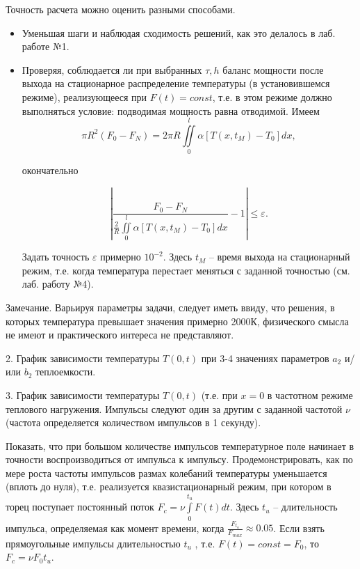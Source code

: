 \documentclass[a4paper,14pt]{article}
\begin{document}
Точность расчета можно оценить разными способами.

\begin{itemize}
	\item Уменьшая шаги и наблюдая сходимость решений, как это делалось в лаб. работе №1. 
	\item Проверяя, соблюдается ли при выбранных $\tau, h$ баланс мощности после выхода на стационарное распределение температуры (в установившемся режиме), реализующееся при
	$F(t) = const$, т.е. в этом режиме  должно выполняться условие: подводимая мощность  равна отводимой. Имеем
	\begin{equation}
		\pi R^2 (F_0 - F_N) = 2 \pi R \iint\limits_0^l \alpha[T(x, t_M) - T_0] dx,
	\end{equation}

	окончательно

	\begin{equation}
		\left| \frac{F_0 - F_N}{ \frac{2}{R} \iint\limits_0^l \alpha[T(x, t_M) - T_0] dx } - 1 \right| \leq \varepsilon.
	\end{equation}

	Задать точность $\varepsilon$ примерно $10^{-2}$. Здесь
	$t_M$ -- время выхода на стационарный режим, т.е. когда температура перестает меняться с заданной точностью (см. лаб. работу №4).
\end{itemize}

Замечание. Варьируя параметры задачи, следует иметь ввиду, что решения, в которых температура превышает значения примерно 2000К, физического смысла не имеют и практического интереса не представляют.

2. График зависимости температуры $T(0, t)$ при 3-4 значениях параметров
$a_2$ и/или $b_2$ теплоемкости.

3. График зависимости температуры $T(0, t)$ (т.е. при $x = 0$ 
в частотном режиме теплового нагружения. Импульсы следуют один за другим с заданной частотой $\nu$
(частота определяется количеством импульсов в 1 секунду). 

Показать, что при большом количестве импульсов температурное поле начинает в точности воспроизводиться от импульса к импульсу.  
Продемонстрировать, как по мере роста частоты импульсов размах колебаний температуры уменьшается (вплоть до нуля), т.е. реализуется квазистационарный режим, при котором в торец поступает постоянный поток
$F_c = \nu \int \limits_0^{t_u} F(t) dt$. Здесь
$t_u$ -- длительность импульса, определяемая как момент времени, когда
$\frac{F_{t_u}}{F_{max}} \approx 0.05$.
Если взять прямоугольные импульсы длительностью $t_u$ , т.е.
$F(t) = const = F_0$, то $F_c = \nu F_0 t_u$.
\end{document}
